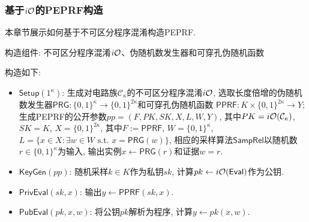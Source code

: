 \subsubsection{基于$\iO$的PEPRF构造}
本章节展示如何基于不可区分程序混淆构造PEPRF.
\begin{construction}[基于$\iO$和PPRF的PEPRF构造]\label{construction:iO-based-PEPRF}
\begin{trivlist}
    \item 构造组件: 不可区分程序混淆$\iO$、伪随机数发生器和可穿孔伪随机函数
\end{trivlist}
构造如下: 
\begin{itemize}
\item $\mathsf{Setup}(1^\kappa)$: 生成对电路族$\mathcal{C}_\kappa$的不可区分程序混淆$\iO$, 
        选取长度倍增的伪随机数发生器$\mathsf{PRG}: \{0, 1\}^{\kappa} \rightarrow \{0,1\}^{2\kappa}$和可穿孔伪随机函数
        $\mathsf{PPRF}: K \times \{0,1\}^{2\kappa} \rightarrow Y$; 
        生成PEPRF的公开参数$pp = (F, PK, SK, X, L, W, Y)$,  
        其中$PK = i\mathcal{O}(\mathcal{C}_\kappa)$, $SK = K$, $X = \{0,1\}^{2\kappa}$, 其中$F:=\mathsf{PPRF}$,  
        $W = \{0,1\}^\kappa$, $L = \{x \in X: \exists w \in W \text{~s.t.~} x= \mathsf{PRG}(w)\}$, 
        相应的采样算法$\mathsf{SampRel}$以随机数$r \in \{0,1\}^\kappa$为输入, 
        输出实例$x \leftarrow \mathsf{PRG}(r)$和证据$w = r$.   

    \item $\mathsf{KeyGen}(pp)$: 随机采样$k \in K$作为私钥$sk$, 计算$pk \leftarrow i\mathcal{O}(\mathsf{Eval})$作为公钥. 

    \item $\mathsf{PrivEval}(sk, x)$: 输出$y \leftarrow \mathsf{PPRF}(sk, x)$. 

    \item $\mathsf{PubEval}(pk, x, w)$: 将公钥$pk$解析为程序, 计算$y \leftarrow pk(x, w)$.   
\end{itemize}
\end{construction}   


